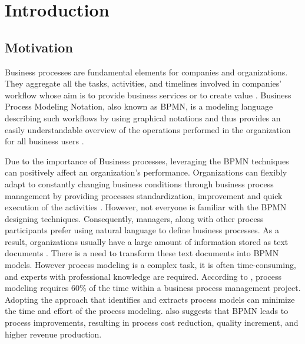 \chapter{Introduction}
\label{sec:intro}

\section{Motivation}
\label{sec:intro:mo}


	Business processes are fundamental elements for companies and organizations. They aggregate all the tasks, activities, and timelines involved in companies' workflow whose aim is to provide business services or to create value \cite{literature_review_2}. Business Process Modeling Notation, also known as BPMN, is a modeling language describing such workflows by using graphical notations and thus provides an easily understandable overview of the operations performed in the organization for all business users \cite{literature_review_1}. 
	
	Due to the importance of Business processes, leveraging the BPMN techniques can positively affect an organization's performance. Organizations can flexibly adapt to constantly changing business conditions through business process management by providing processes standardization, improvement and quick execution of the activities \cite{t2m_5}. However, not everyone is familiar with the BPMN designing techniques. Consequently, managers, along with other process participants prefer using natural language to define business processes. As a result, organizations usually have a large amount of information stored as text documents \cite{literature_review_2}. There is a need to transform these text documents into BPMN models. However process modeling is a complex task, it is often time-consuming, and experts with professional knowledge are required. According to \cite{t2m_5}, process modeling requires 60\% of the time within a business process management project. Adopting the approach that identifies and extracts process models can minimize the time and effort of the process modeling. \cite{literature_review_3} also suggests that  BPMN leads to process improvements, resulting in process cost reduction, quality increment, and higher revenue production. 
	
